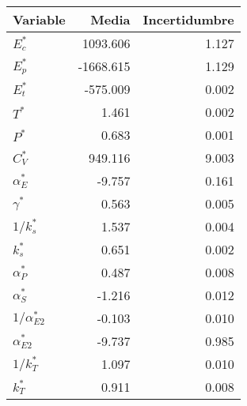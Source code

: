 \begin{tabular}{lrr}
\toprule
Variable & Media & Incertidumbre \\
\midrule
$E_c^*$ & 1093.606 & 1.127 \\
$E_p^*$ & -1668.615 & 1.129 \\
$E_t^*$ & -575.009 & 0.002 \\
$T^*$ & 1.461 & 0.002 \\
$P^*$ & 0.683 & 0.001 \\
$C_V^*$ & 949.116 & 9.003 \\
$\alpha_E^*$ & -9.757 & 0.161 \\
$\gamma^*$ & 0.563 & 0.005 \\
$1/k_s^*$ & 1.537 & 0.004 \\
$k_s^*$ & 0.651 & 0.002 \\
$\alpha_P^*$ & 0.487 & 0.008 \\
$\alpha_S^*$ & -1.216 & 0.012 \\
$1/\alpha_{E2}^*$ & -0.103 & 0.010 \\
$\alpha_{E2}^*$ & -9.737 & 0.985 \\
$1/k_T^*$ & 1.097 & 0.010 \\
$k_T^*$ & 0.911 & 0.008 \\
\bottomrule
\end{tabular}
